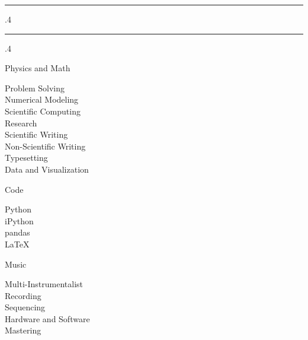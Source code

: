 \documentclass[10pt]{article}
\makeatletter
\newcommand*\rulefill[1][.4\p@]{%
    \leavevmode
    \leaders \hrule \@height #1\relax \hfill
    \null
  }
\makeatother
\begin{document}
\hspace{5mm}
\begin{minipage}[t]{62mm}
	\textcolor{black!20}{\rulefill\quad 
		{\fontsize{14}{25}\selectfont \textsl{}} 
	\quad\rulefill}

\vspace{0.5cm}

	{\fontsize{16}{20}\selectfont \textcolor{black!65}{Physics and Math}}

\vspace{-0.75cm}

	{\fontsize{13}{15}\selectfont \textcolor{black!45}{
		\begin{justify}
			Problem Solving					\\
			Numerical Modeling				\\
			Scientific Computing				\\
			Research 							\\
			Scientific Writing 					\\			
			Non-Scientific Writing	 			\\
			Typesetting						\\
			Data and Visualization				\\
		\end{justify}}}

	{\fontsize{16}{20}\selectfont \textcolor{black!65}{Code}}

\vspace{-0.75cm}

	{\fontsize{13}{15}\selectfont \textcolor{black!45}{
		\begin{justify}
			Python				\\
			iPython				\\
			pandas				\\
			\LaTeX				\\
		\end{justify}}}

	{\fontsize{16}{20}\selectfont \textcolor{black!65}{Music}}

\vspace{-0.75cm}

	{\fontsize{13}{15}\selectfont \textcolor{black!45}{
		\begin{justify}
			Multi-Instrumentalist			\\
			Recording					\\
			Sequencing					\\
			Hardware and Software			\\
			Mastering					\\
		\end{justify}}}

\end{minipage}
\end{document}
